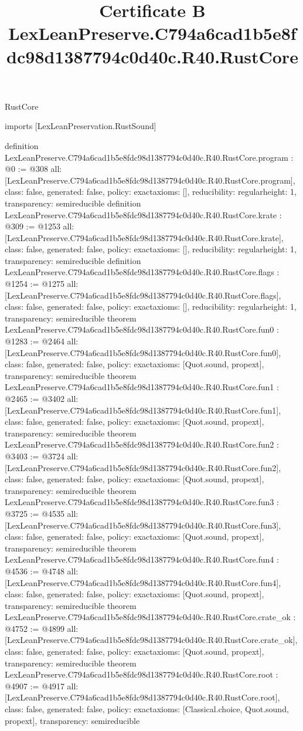 \begin{lexlean}{RustCore}
\title{Certificate B LexLeanPreserve.C794a6cad1b5e8fdc98d1387794c0d40c.R40.RustCore}
\begin{coremodule}
imports [LexLeanPreservation.RustSound]

definition LexLeanPreserve.C794a6cad1b5e8fdc98d1387794c0d40c.R40.RustCore.program : @0 := @308 {
  all: [LexLeanPreserve.C794a6cad1b5e8fdc98d1387794c0d40c.R40.RustCore.program],
  class: false,
  generated: false,
  policy: exact{axioms: []},
  reducibility: regular{height: 1},
  transparency: semireducible
}
definition LexLeanPreserve.C794a6cad1b5e8fdc98d1387794c0d40c.R40.RustCore.krate : @309 := @1253 {
  all: [LexLeanPreserve.C794a6cad1b5e8fdc98d1387794c0d40c.R40.RustCore.krate],
  class: false,
  generated: false,
  policy: exact{axioms: []},
  reducibility: regular{height: 1},
  transparency: semireducible
}
definition LexLeanPreserve.C794a6cad1b5e8fdc98d1387794c0d40c.R40.RustCore.flags : @1254 := @1275 {
  all: [LexLeanPreserve.C794a6cad1b5e8fdc98d1387794c0d40c.R40.RustCore.flags],
  class: false,
  generated: false,
  policy: exact{axioms: []},
  reducibility: regular{height: 1},
  transparency: semireducible
}
theorem LexLeanPreserve.C794a6cad1b5e8fdc98d1387794c0d40c.R40.RustCore.fun0 : @1283 := @2464 {
  all: [LexLeanPreserve.C794a6cad1b5e8fdc98d1387794c0d40c.R40.RustCore.fun0],
  class: false,
  generated: false,
  policy: exact{axioms: [Quot.sound, propext]},
  transparency: semireducible
}
theorem LexLeanPreserve.C794a6cad1b5e8fdc98d1387794c0d40c.R40.RustCore.fun1 : @2465 := @3402 {
  all: [LexLeanPreserve.C794a6cad1b5e8fdc98d1387794c0d40c.R40.RustCore.fun1],
  class: false,
  generated: false,
  policy: exact{axioms: [Quot.sound, propext]},
  transparency: semireducible
}
theorem LexLeanPreserve.C794a6cad1b5e8fdc98d1387794c0d40c.R40.RustCore.fun2 : @3403 := @3724 {
  all: [LexLeanPreserve.C794a6cad1b5e8fdc98d1387794c0d40c.R40.RustCore.fun2],
  class: false,
  generated: false,
  policy: exact{axioms: [Quot.sound, propext]},
  transparency: semireducible
}
theorem LexLeanPreserve.C794a6cad1b5e8fdc98d1387794c0d40c.R40.RustCore.fun3 : @3725 := @4535 {
  all: [LexLeanPreserve.C794a6cad1b5e8fdc98d1387794c0d40c.R40.RustCore.fun3],
  class: false,
  generated: false,
  policy: exact{axioms: [Quot.sound, propext]},
  transparency: semireducible
}
theorem LexLeanPreserve.C794a6cad1b5e8fdc98d1387794c0d40c.R40.RustCore.fun4 : @4536 := @4748 {
  all: [LexLeanPreserve.C794a6cad1b5e8fdc98d1387794c0d40c.R40.RustCore.fun4],
  class: false,
  generated: false,
  policy: exact{axioms: [Quot.sound, propext]},
  transparency: semireducible
}
theorem LexLeanPreserve.C794a6cad1b5e8fdc98d1387794c0d40c.R40.RustCore.crate_ok : @4752 := @4899 {
  all: [LexLeanPreserve.C794a6cad1b5e8fdc98d1387794c0d40c.R40.RustCore.crate_ok],
  class: false,
  generated: false,
  policy: exact{axioms: [Quot.sound, propext]},
  transparency: semireducible
}
theorem LexLeanPreserve.C794a6cad1b5e8fdc98d1387794c0d40c.R40.RustCore.root : @4907 := @4917 {
  all: [LexLeanPreserve.C794a6cad1b5e8fdc98d1387794c0d40c.R40.RustCore.root],
  class: false,
  generated: false,
  policy: exact{axioms: [Classical.choice, Quot.sound, propext]},
  transparency: semireducible
}


\end{coremodule}
\end{lexlean}
